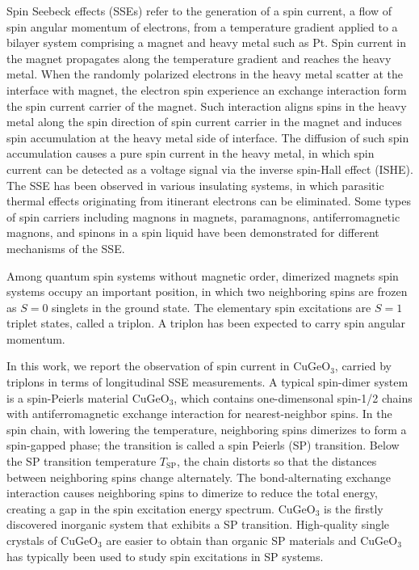 \documentclass{nature}
\begin{document}
Spin Seebeck effects\cite{Uchida:2008cc} (SSEs) refer to the generation of a spin current, a flow of spin angular momentum of electrons, from a temperature gradient applied to a bilayer system comprising a magnet and heavy metal such as Pt.
Spin current in the magnet propagates along the temperature gradient and reaches the heavy metal\cite{Takahashi:2010ju}.
When the randomly polarized electrons in the  heavy metal scatter at the interface with magnet, the electron spin experience an exchange interaction form the spin current carrier of the magnet. Such interaction aligns spins in the heavy metal along the spin direction of spin current carrier in the magnet and induces spin accumulation at the heavy metal side of interface. The diffusion of such spin accumulation causes a pure spin current in the heavy metal, in which spin current can be detected as a voltage signal via the inverse spin-Hall effect (ISHE)\cite{Saitoh:2006kk,Valenzuela:2006cs}.
The SSE has been observed in various insulating systems, in which parasitic thermal effects originating from itinerant electrons can be eliminated. Some types of spin carriers
 including magnons in magnets\cite{Ito:2019bq,2015NatPh..11.1022C,Seki:2015esa,Wu:2016hh}, paramagnons\cite{Wu:2015gf}, antiferromagnetic magnons\cite{Seki:2015esa,Wu:2016hh}, and spinons in a spin liquid\cite{Hirobe:2016eg,Hirobe:2018ds} have been demonstrated for different mechanisms of the SSE.


\par 

Among quantum spin systems without magnetic order, dimerized magnets spin systems occupy an important position, in which two neighboring spins are frozen as $S=0$ singlets in the ground state.
The elementary spin excitations are $S=1$ triplet states, called a triplon. 
A triplon has been expected to carry spin angular momentum. 


\par 
In this work, we report the observation of spin current in CuGeO$_3$, carried by triplons in terms of longitudinal SSE measurements. A typical spin-dimer system is a spin-Peierls material
 CuGeO$_3$, which contains 
 one-dimensonal spin-1/2 chains with antiferromagnetic exchange interaction for nearest-neighbor spins.
In the spin chain, with lowering the temperature, neighboring spins dimerizes to form a spin-gapped phase;
the transition is called a spin Peierls (SP) transition\cite{Pytte:1974jt}.
Below the SP transition temperature $T_{\mathrm{SP}}$, the chain
distorts so that the distances between neighboring spins change alternately.  
The bond-alternating exchange interaction causes neighboring spins to dimerize to reduce the total energy, creating a gap in the spin excitation energy spectrum. CuGeO$_3$ is the firstly discovered inorganic system that exhibits a SP transition\cite{Hase:1993bo}. 
High-quality single crystals of CuGeO$_3$ are easier to obtain than organic SP materials and CuGeO$_3$ has typically been used to study spin excitations in SP systems\cite{2002JPCM...14R.195U}.
\end{document}
